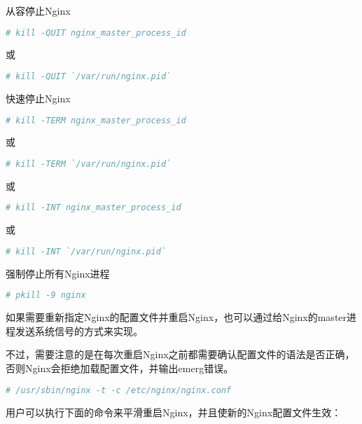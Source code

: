 \begin{compactitem}
\item 从容停止Nginx

\begin{lstlisting}[language=bash]
# kill -QUIT nginx_master_process_id
\end{lstlisting}

或

\begin{lstlisting}[language=bash]
# kill -QUIT `/var/run/nginx.pid`
\end{lstlisting}

\item 快速停止Nginx

\begin{lstlisting}[language=bash]
# kill -TERM nginx_master_process_id
\end{lstlisting}

或

\begin{lstlisting}[language=bash]
# kill -TERM `/var/run/nginx.pid`
\end{lstlisting}

或

\begin{lstlisting}[language=bash]
# kill -INT nginx_master_process_id
\end{lstlisting}

或

\begin{lstlisting}[language=bash]
# kill -INT `/var/run/nginx.pid`
\end{lstlisting}

\item 强制停止所有Nginx进程

\begin{lstlisting}[language=bash]
# pkill -9 nginx
\end{lstlisting}
\end{compactitem}


如果需要重新指定Nginx的配置文件并重启Nginx，也可以通过给Nginx的master进程发送系统信号的方式来实现。

不过，需要注意的是在每次重启Nginx之前都需要确认配置文件的语法是否正确，否则Nginx会拒绝加载配置文件，并输出emerg错误。



\begin{lstlisting}[language=bash]
# /usr/sbin/nginx -t -c /etc/nginx/nginx.conf
\end{lstlisting}

用户可以执行下面的命令来平滑重启Nginx，并且使新的Nginx配置文件生效：

